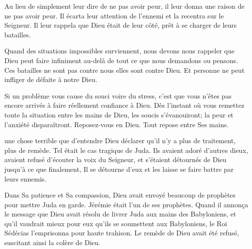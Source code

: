 Au lieu de simplement leur dire de ne pas avoir peur,
 il leur donna une raison de ne pas avoir peur.
 Il écarta leur attention de l'ennemi et la recentra sur le Seigneur.
 Il leur rappela que Dieu était de leur côté,
 prêt à se charger de leurs batailles.


Quand des situations impossibles surviennent,
 nous devons nous rappeler que Dieu peut faire infiniment au-delà
 de tout ce que nous demandons ou pensons.
 Ces batailles ne sont pas contre nous \ocadr{}elles sont contre Dieu.
 Et personne ne peut infliger de défaite à notre Dieu.

Si un problème vous cause du souci voire du stress,
 c'est que vous n'êtes pas encore arrivés à faire réellement
 confiance à Dieu.
 Dès l'instant où vous remettez toute la situation entre les mains de Dieu,
 les soucis s'évanouiront; la peur et l'anxiété disparaîtront.
 Reposez-vous en Dieu. Tout repose entre Ses mains. 

\dvrule







 une chose terrible que d'entendre Dieu déclarer
 qu'il n'y a plus de traitement, plus de remède.
 Tel était le cas tragique de Juda.
 Ils avaient adoré d'autres dieux, avaient refusé d'écouter
 la voix du Seigneur, et s'étaient détournés de Dieu
 \ocadr{}jusqu'à ce que finalement, Il se détourne d'eux
 et les laisse se faire battre par leurs ennemis. 


Dans Sa patience et Sa compassion, Dieu avait envoyé beaucoup de prophètes
 pour mettre Juda en garde.
 Jérémie était l'un de ses prophètes.
 Quand il annonça le message que Dieu avait résolu de livrer Juda
 aux mains des Babyloniens,
 et qu'il vaudrait mieux pour eux qu'ils se soumettent aux Babyloniens,
 le Roi Sédécias l'emprisonna pour haute trahison.
 Le remède de Dieu avait été refusé, suscitant ainsi la colère de Dieu.

